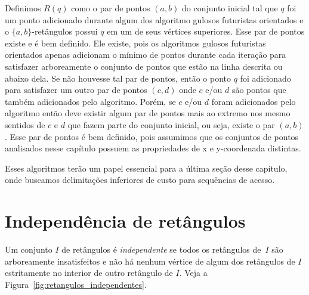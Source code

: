 Definimos $R(q)$ como o par de pontos $(a,b)$ do conjunto inicial tal que $q$ foi um ponto adicionado durante algum dos algoritmo gulosos futuristas orientados e o $\{a,b\}$-retângulos possui $q$ em um de seus vértices superiores. Esse par de pontos existe e é bem definido. Ele existe, pois os algoritmos gulosos futuristas orientados apenas adicionam o mínimo de pontos durante cada iteração para satisfazer arboreamente o conjunto de pontos que estão na linha descrita ou abaixo dela. Se não houvesse tal par de pontos, então o ponto $q$ foi adicionado para satisfazer um outro par de pontos $(c,d)$ onde $c$ e/ou $d$ são pontos que também adicionados pelo algoritmo. Porém, se $c$ e/ou $d$ foram adicionados pelo algoritmo então deve existir algum par de pontos mais ao extremo nos mesmo sentidos de $c$ e $d$ que fazem parte do conjunto inicial, ou seja, existe o par $(a,b)$. Esse par de pontos é bem definido, pois assumimos que os conjuntos de pontos analisados nesse capítulo possuem as propriedades de x e y-coordenada distintas.

Esses algoritmos terão um papel essencial para a última seção desse capítulo, onde buscamos delimitações inferiores de custo para sequências de acesso.

\section{Independência de retângulos}
Um conjunto $I$ de retângulos é \textit{independente} se todos os retângulos de~$I$ são arboreamente insatisfeitos e não há nenhum vértice de algum dos retângulos de $I$ estritamente no interior de outro retângulo de $I$. Veja a Figura~\ref{fig:retangulos_independentes}.

